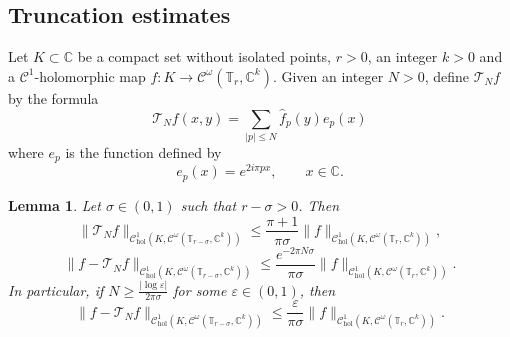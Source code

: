 \documentclass[10pt]{article}
\newtheorem{lemma}[theorem]{Lemma}
\newcommand{\C}{\mathbb{C}}
\newcommand{\T}{\mathbb{T}}
\begin{document}
\subsection{Truncation estimates}

Let $K\subset \C$ be a compact set without isolated points, $r>0$, an integer $k>0$ and a $\mathscr C^1$-holomorphic map $f:K\to\mathscr C^{\omega}(\T_r,\C^k)$.
Given an integer $N>0$, define $\mathscr T_N f$ by the formula
\[
 \mathscr T_N f(x,y) = \sum_{|p|\leq N} \widehat f_p(y)e_p(x)
 \]
 where $e_p$ is the function defined by 
 \[
 e_p(x) = e^{2i\pi p x},
 \qquad x\in\C.
 \]

\begin{lemma}
\label{lemma:truncation_estimates}
Let $\sigma\in(0,1)$ such that $r-\sigma>0$. Then
\[
\|\mathscr T_N f\|_{\mathscr C^1_{\text{hol}}(K,\mathscr C^{\omega}(\T_{r-\sigma},\C^k))}
\leq
\frac{\pi + 1}{\pi\sigma}\|f\|_{\mathscr C^1_{\text{hol}}(K,\mathscr C^{\omega}(\T_r,\C^k))},
\]
\[ 
\|f - \mathscr T_N f\|_{\mathscr C^1_{\text{hol}}(K,\mathscr C^{\omega}(\T_{r-\sigma},\C^k))}
\leq
\frac{e^{-2\pi N\sigma}}{\pi\sigma} \|f\|_{\mathscr C^1_{\text{hol}}(K,\mathscr C^{\omega}(\T_r,\C^k))}. 
\]
In particular, if 
$N \geq \frac{\left| \log \varepsilon \right|}{2\pi\sigma}$ 
for some $\varepsilon\in(0,1)$, then
\[ 
\|f - \mathscr T_N f\|_{\mathscr C^1_{\text{hol}}(K,\mathscr C^{\omega}(\T_{r-\sigma},\C^k))}
\leq
\frac{\varepsilon }{\pi\sigma}\|f\|_{\mathscr C^1_{\text{hol}}(K,\mathscr C^{\omega}(\T_r,\C^k))}. 
\]
\end{lemma}
\end{document}
